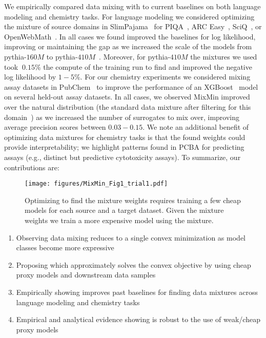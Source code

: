 We empirically compared data mixing with \method to current baselines on both language modeling and chemistry tasks. For language modeling we considered optimizing the mixture of source domains in SlimPajama~\citep{cerebras2023slimpajama} for PIQA~\citep{bisk2020piqa}, ARC Easy~\citep{Clark2018ThinkYH}, SciQ~\citep{Welbl2017CrowdsourcingMC}, or OpenWebMath~\citep{paster2023openwebmath}. In all cases we found \method improved the baselines for log likelihood, improving or maintaining the gap as we increased the scale of the models from pythia-$160M$ to pythia-$410M$~\citep{biderman2023pythia}. Moreover, for pythia-$410M$ the mixtures we used took  $~0.15\%$ the compute of the training run to find and improved the negative log likelihood by $1-5\%$. For our chemistry experiments we considered mixing assay datasets in PubChem~\citep{beaini2023towards,kim2016pubchem} to improve the performance of an XGBoost~\citep{chen2016xgboost} model on several held-out assay datasets. In all cases, we observed MixMin improved over the natural distribution  (the standard data mixture after filtering for this domain~\citep{salem2020transcreen,li2022improving, ye2018integrated}) as we increased the number of surrogates to mix over, improving average precision scores between $0.03 - 0.15$. We note an additional benefit of optimizing data mixtures for chemistry tasks is that the found \method weights could provide interpretability; we highlight patterns \method found in PCBA for predicting assays (e.g., distinct but predictive cytotoxicity assays). To summarize, our contributions are:





\begin{figure*}[t]
\centering
    \texttt{[image: figures/MixMin\_Fig1\_trial1.pdf]}
\caption{Optimizing \method to find the mixture weights requires training a few cheap models for each source and a target dataset. Given the mixture weights we train a more expensive model using the mixture.}
\label{fig:mixmin_flow}
\end{figure*}

\begin{enumerate}
    \item Observing data mixing reduces to a single convex minimization as model classes become more expressive
    \item Proposing \method which approximately solves the convex objective by using cheap proxy models and downstream data samples
    \item Empirically showing \method improves past baselines for finding data mixtures across language modeling and chemistry tasks
    \item Empirical and analytical evidence showing \method is robust to the use of weak/cheap proxy models
\end{enumerate}










